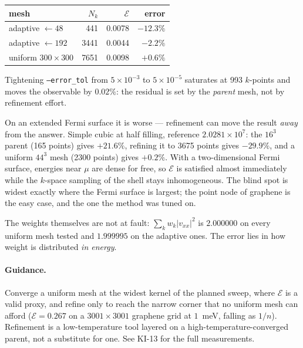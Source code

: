 \documentclass[11pt,a4paper]{article}
\newcommand{\code}[1]{\texttt{#1}}
\begin{document}
\begin{center}
\begin{tabular}{lrrr}
\toprule
mesh & $N_k$ & $\mathcal{E}$ & error \\
\midrule
adaptive $\leftarrow 48$   &  441 & 0.0078 & $-12.3\%$ \\
adaptive $\leftarrow 192$  & 3441 & 0.0044 & $-2.2\%$ \\
uniform $300\times300$     & 7651 & 0.0098 & $+0.6\%$ \\
\bottomrule
\end{tabular}
\end{center}

\noindent
Tightening \code{--error\_tol} from $5\times10^{-3}$ to $5\times10^{-5}$
saturates at 993 $k$-points and moves the observable by $0.02\%$: the residual
is set by the \emph{parent} mesh, not by refinement effort.

On an extended Fermi surface it is worse --- refinement can move the result
\emph{away} from the answer. Simple cubic at half filling, reference
$2.0281\times10^{7}$: the $16^3$ parent (165 points) gives $+21.6\%$, refining
it to 3675 points gives $-29.9\%$, and a uniform $44^3$ mesh (2300 points)
gives $+0.2\%$. With a two-dimensional Fermi surface, energies near $\mu$ are
dense for free, so $\mathcal{E}$ is satisfied almost immediately while the
$k$-space sampling of the shell stays inhomogeneous. The blind spot is widest
exactly where the Fermi surface is largest; the point node of graphene is the
easy case, and the one the method was tuned on.

The weights themselves are not at fault: $\sum_k w_k |v_{xx}|^2$ is
$2.000000$ on every uniform mesh tested and $1.999995$ on the adaptive ones.
The error lies in how weight is distributed \emph{in energy}.

\paragraph{Guidance.} Converge a uniform mesh at the widest kernel of the
planned sweep, where $\mathcal{E}$ is a valid proxy, and refine only to reach
the narrow corner that no uniform mesh can afford ($\mathcal{E}=0.267$ on a
$3001\times3001$ graphene grid at $1$~meV, falling as $1/n$). Refinement is a
low-temperature tool layered on a high-temperature-converged parent, not a
substitute for one. See KI-13 for the full measurements.
\end{document}
